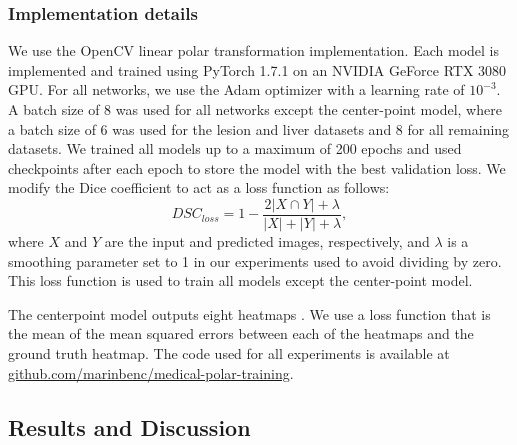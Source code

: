     \subsubsection{Implementation details}

We use the OpenCV linear polar transformation implementation.
Each model is implemented and trained using PyTorch 1.7.1 on an NVIDIA GeForce RTX 3080 GPU. For all 
networks, we use the Adam optimizer with a learning rate of $10^{-3}$. A batch size of 8 was used for all 
networks except the center-point model, where a batch size of 6 was used for the lesion and liver datasets 
and 8 for all remaining datasets. We trained all models up to a maximum of 200 epochs and used checkpoints 
after each epoch to store the model with the best validation loss. We modify the Dice coefficient to act as a loss function as follows:
  \begin{equation}
    \textit{DSC}_{loss} = 1 - \frac {2\lvert X\cap Y\rvert + \lambda}{\lvert X\rvert + \lvert Y\rvert + \lambda},
    \label{eq:dice-loss}
  \end{equation}
where $X$ and $Y$ are the input and predicted images, respectively, and $\lambda$ is a smoothing parameter set to 1 in our experiments used to avoid dividing by zero.
This loss function is used to train all models except the center-point model.

The centerpoint model outputs eight heatmaps \cite{newellStackedHourglassNetworks2016}. 
We use a loss function that is the mean of the mean squared errors between each of the heatmaps and the ground truth heatmap.
The code used for all experiments is available at \url{github.com/marinbenc/medical-polar-training}.

  \subsection{Results and Discussion}


